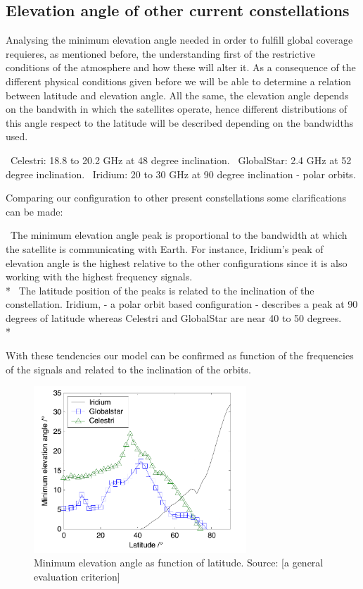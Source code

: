 \subsection{Elevation angle of other current constellations}

Analysing the minimum elevation angle needed in order to fulfill global coverage requieres, as mentioned before, the understanding first of the restrictive conditions of the atmosphere and how these will alter it. As a consequence of the different physical conditions given before we will be able to determine a relation between latitude and elevation angle. All the same, the elevation angle depends on the bandwith in which the satellites operate, hence different distributions of this angle respect to the latitude will be described depending on the bandwidths used. 

\textendash\ Celestri: 18.8 to 20.2 GHz at 48 degree inclination.
\textendash\ GlobalStar: 2.4 GHz at 52 degree inclination.
\textendash\ Iridium: 20 to 30 GHz at 90 degree inclination - polar orbits.

Comparing our configuration to other present constellations some clarifications can be made: 

\textendash\ The minimum elevation angle peak is proportional to the bandwidth at which the satellite is communicating with Earth. For instance, Iridium's peak of elevation angle is the highest relative to the other configurations since it is also working with the highest frequency signals. \\*
\textendash\ The latitude position of the peaks is related to the inclination of the constellation. Iridium, - a polar orbit based configuration - describes a peak at 90 degrees of latitude whereas Celestri and GlobalStar are near 40 to 50 degrees. \\*

With these tendencies our model can be confirmed as function of the frequencies of the signals and related to the inclination of the orbits. 

\begin{figure}[h]
\includegraphics[width=8cm]{latitudes}
\centering
\caption{Minimum elevation angle as function of latitude. Source: [a general evaluation criterion]}
\end{figure}